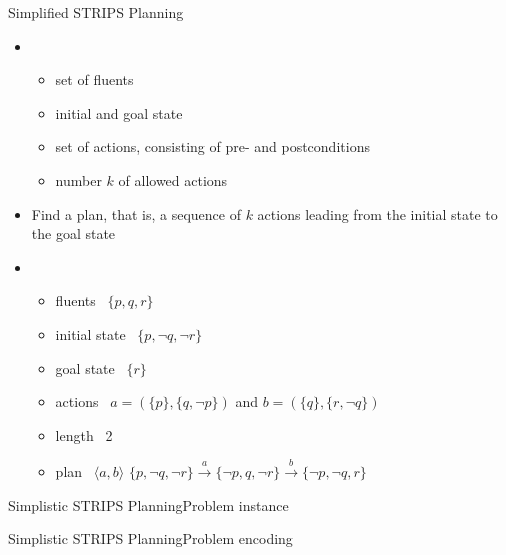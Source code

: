 \begin{frame}{Simplified STRIPS Planning}

  \begin{itemize}
  \item<2-> 
    \begin{itemize}
    \item set of fluents
    \item initial and goal state
    \item set of actions, consisting of pre- and postconditions
    \item number $k$ of allowed actions
    \end{itemize}
  \item<2-> 
    Find a plan, that is, a sequence of $k$ actions leading from the initial state to the goal state
    \smallskip
  \item<3-> 
    \begin{itemize}
    \item fluents       \ $\{p,     q,     r\}$
    \item initial state \ $\{p,\neg q,\neg r\}$
    \item goal state    \ $\{r\}$
    \item actions       \ $a = (\{p\},\{q,\neg p\})$ and $b = (\{q\},\{r,\neg q\})$
    \item length        \ 2
      \medskip
    \item<4-> plan      \ $\langle a, b \rangle$
      \qquad
      \(
      \{     p,\neg q,\neg r\}
      \stackrel{a}{\longrightarrow}
      \{\neg p,     q,\neg r\}
      \stackrel{b}{\longrightarrow}
      \{\neg p,\neg q,     r\}
      \)
    \end{itemize}
    \medskip
  \end{itemize}

\end{frame}
\begin{frame}{Simplistic STRIPS Planning}{Problem instance}
  \bigskip
  
\end{frame}
\begin{frame}[fragile,shrink=10]{Simplistic STRIPS Planning}{Problem encoding}
  \bigskip
  
\end{frame}
